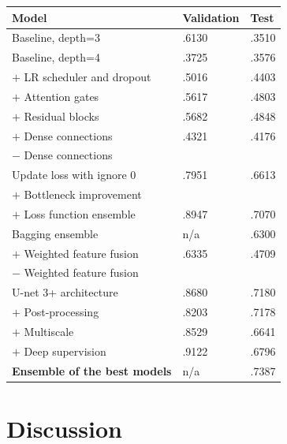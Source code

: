 \documentclass[11pt]{article}
\begin{document}
\begin{multicols}{2}
    \begin{table}[H]
        \centering
        \setlength{\tabcolsep}{3pt}
        \begin{tabularx}{\linewidth}{lYY}
            \toprule
            Model                                & Validation & Test  \\
            \midrule
            Baseline, depth=3                    & .6130      & .3510 \\
            Baseline, depth=4                    & .3725      & .3576 \\
            $+$ LR scheduler and dropout         & .5016      & .4403 \\
            $+$ Attention gates                  & .5617      & .4803 \\
            $+$ Residual blocks                  & .5682      & .4848 \\
            $+$ Dense connections                & .4321      & .4176 \\
            $-$ Dense connections                &            &       \\
            Update loss with ignore 0            & .7951      & .6613 \\
            $+$ Bottleneck improvement           &            &       \\
            $+$ Loss function ensemble           & .8947      & .7070 \\
            Bagging ensemble                     & n/a        & .6300 \\
            $+$ Weighted feature fusion          & .6335      & .4709 \\
            $-$ Weighted feature fusion          &            &       \\
            U-net 3+ architecture                & .8680      & .7180 \\
            $+$ Post-processing                  & .8203      & .7178 \\
            $+$ Multiscale                       & .8529      & .6641 \\
            $+$ Deep supervision                 & .9122      & .6796 \\
            \textbf{Ensemble of the best models} & n/a        & .7387 \\
            \bottomrule
        \end{tabularx}
        \label{tab:our_per}
    \end{table}

    \section{Discussion}


\end{multicols}
\end{document}
